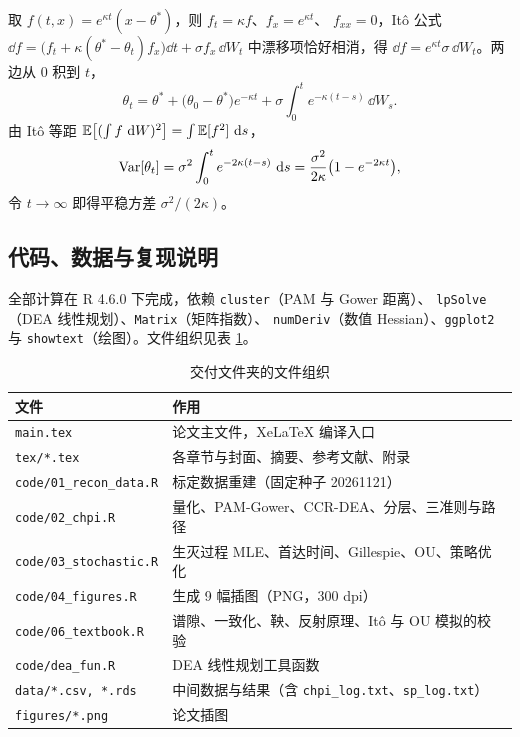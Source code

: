 取 $f(t,x)=e^{\kappa t}(x-\theta^{*})$，则 $f_t=\kappa f$、$f_x=e^{\kappa t}$、
$f_{xx}=0$，Itô 公式
$\dd f=\bigl(f_t+\kappa(\theta^{*}-\theta_t)f_x\bigr)\dd t+\sigma f_x\,\dd W_t$
中漂移项恰好相消，得 $\dd f=e^{\kappa t}\sigma\,\dd W_t$。两边从 $0$ 积到 $t$，
\begin{equation}
\theta_t=\theta^{*}+\bigl(\theta_0-\theta^{*}\bigr)e^{-\kappa t}
+\sigma\int_0^{t}e^{-\kappa(t-s)}\,\dd W_s .
\end{equation}
由 Itô 等距 $\mathbb{E}\bigl[(\int f\,\,\mathrm{d} W)^2\bigr]=\int\mathbb{E}[f^2]\,\,\mathrm{d} s$，
\begin{equation}
\operatorname{Var}[\theta_t]=\sigma^{2}\int_0^{t}e^{-2\kappa(t-s)}\,\,\mathrm{d} s
=\frac{\sigma^{2}}{2\kappa}\bigl(1-e^{-2\kappa t}\bigr),
\end{equation}
令 $t\to\infty$ 即得平稳方差 $\sigma^{2}/(2\kappa)$。

\subsection{代码、数据与复现说明}

全部计算在 R 4.6.0 下完成，依赖 \texttt{cluster}（PAM 与 Gower 距离）、
\texttt{lpSolve}（DEA 线性规划）、\texttt{Matrix}（矩阵指数）、
\texttt{numDeriv}（数值 Hessian）、\texttt{ggplot2} 与
\texttt{showtext}（绘图）。文件组织见表 \ref{tab:files}。

\begin{table}[H]
\tabfont
\caption{交付文件夹的文件组织}
\label{tab:files}
\begin{tabularx}{\textwidth}{@{}p{4.9cm}X@{}}
\toprule
文件 & 作用 \\
\midrule
\texttt{main.tex} & 论文主文件，XeLaTeX 编译入口 \\
\texttt{tex/*.tex} & 各章节与封面、摘要、参考文献、附录 \\
\texttt{code/01\_recon\_data.R} & 标定数据重建（固定种子 20261121） \\
\texttt{code/02\_chpi.R} & 量化、PAM-Gower、CCR-DEA、分层、三准则与路径 \\
\texttt{code/03\_stochastic.R} & 生灭过程 MLE、首达时间、Gillespie、OU、策略优化 \\
\texttt{code/04\_figures.R} & 生成 9 幅插图（PNG，300 dpi） \\
\texttt{code/06\_textbook.R} & 谱隙、一致化、鞅、反射原理、Itô 与 OU 模拟的校验 \\
\texttt{code/dea\_fun.R} & DEA 线性规划工具函数 \\
\texttt{data/*.csv, *.rds} & 中间数据与结果（含 \texttt{chpi\_log.txt}、\texttt{sp\_log.txt}） \\
\texttt{figures/*.png} & 论文插图 \\
\bottomrule
\end{tabularx}
\end{table}

